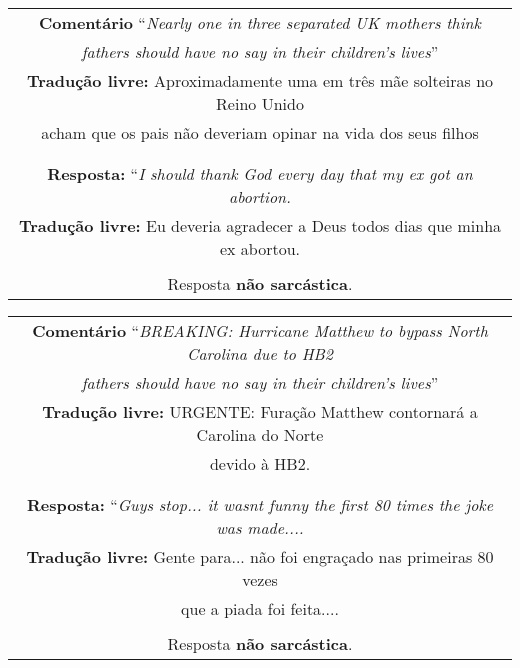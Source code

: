 \begin{center}
\begin{tabular}{|c|}

\hline

\textbf{Comentário} ``\textit{Nearly one in three separated UK mothers think} \\
\textit{fathers should have no say in their children's lives}'' \\

\textbf{Tradução livre:} Aproximadamente uma em três mãe solteiras no Reino Unido\\
acham que os pais não deveriam opinar na vida dos seus filhos \\ \\

\hline

\\

\textbf{Resposta:} ``\textit{I should thank God every day that my ex got an abortion.} \\

\textbf{Tradução livre:} Eu deveria agradecer a Deus todos dias que minha ex abortou. \\ \\

Resposta \textbf{não sarcástica}.

\\ \hline

\end{tabular}
\end{center}

\begin{center}
\begin{tabular}{|c|}

\hline

\textbf{Comentário} ``\textit{BREAKING: Hurricane Matthew to bypass North Carolina due to HB2} \\
\textit{fathers should have no say in their children's lives}'' \\

\textbf{Tradução livre:} URGENTE: Furação Matthew contornará a Carolina do Norte \\
devido à HB2. \\ \\

\hline

\\

\textbf{Resposta:} ``\textit{Guys stop... it wasnt funny the first 80 times the
joke was made....} \\

\textbf{Tradução livre:} Gente para... não foi engraçado nas primeiras 80 vezes
\\
que a piada foi feita.... \\ \\

Resposta \textbf{não sarcástica}.

\\ \hline

\end{tabular}
\end{center}

